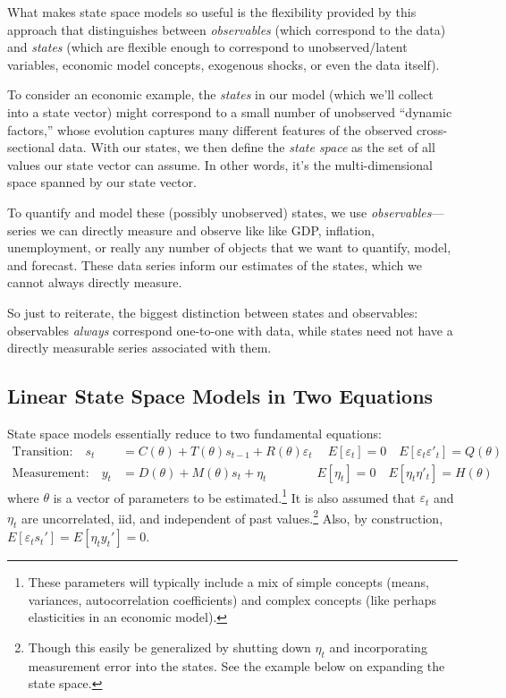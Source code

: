 \documentclass[a4paper,12pt]{article}
\begin{document}
What makes state space models so useful is the flexibility provided by
this approach that distinguishes between \emph{observables} (which
correspond to the data) and \emph{states} (which are flexible enough to
correspond to unobserved/latent variables, economic model concepts,
exogenous shocks, or even the data itself).

To consider an economic example, the \emph{states} in our model (which
we'll collect into a state vector) might correspond to a small number of
unobserved ``dynamic factors,'' whose evolution captures many different
features of the observed cross-sectional data.  With our states, we then
define the \emph{state space} as the set of all values our state vector
can assume. In other words, it's the multi-dimensional space spanned by
our state vector.

To quantify and model these (possibly unobserved) states, we use
\emph{observables}---series we can directly measure and observe like
like GDP, inflation, unemployment, or really any number of objects that
we want to quantify, model, and forecast. These data series inform our
estimates of the states, which we cannot always directly measure.

So just to reiterate, the biggest distinction between states and
observables: observables \emph{always} correspond one-to-one with data,
while states need not have a directly measurable series associated with
them.

\subsection{Linear State Space Models in Two Equations}

State space models essentially reduce to two fundamental equations:
\begin{align}
  \text{Transition:} \quad
    s_{t} &= C(\theta) + T(\theta) s_{t-1}
    + R(\theta)\varepsilon_{t} \label{ste}\
    \quad E[\varepsilon_t] = 0
    \quad E[\varepsilon_t \varepsilon'_t] =  Q(\theta) \\
  \text{Measurement:} \quad
    y_{t} &= D(\theta) + M(\theta) s_{t} + \eta_{t} \label{moe}
    \qquad\qquad E[\eta_t] =  0
    \quad E[\eta_t \eta'_t] =  H(\theta)
\end{align}
where $\theta$ is a vector of parameters to be estimated.\footnote{These
parameters will typically include a mix of simple concepts (means,
variances, autocorrelation coefficients) and complex concepts (like
perhaps elasticities in an economic model).} It is also assumed that
$\varepsilon_t$ and $\eta_t$ are uncorrelated, iid, and independent of
past values.\footnote{Though this easily be generalized by shutting down
  $\eta_t$ and incorporating measurement error into the states. See the
example below on expanding the state space.} Also, by construction,
$E[\varepsilon_t s_t']=E[\eta_t y_t']=0$.
\end{document}
